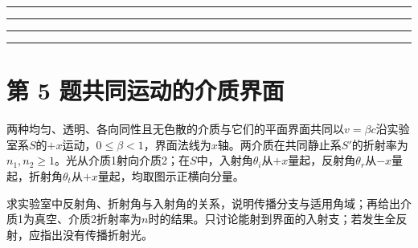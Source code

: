 \documentclass[UTF8,fontset=fandol,a4paper,11pt]{ctexart}
\newcommand{\workarea}{\par\vspace{7mm}\noindent{\small\color{muted}作答区}\par\vspace{4mm}
\noindent\textcolor{rulegray}{\rule{\linewidth}{0.3pt}}\par\vspace{16mm}
\noindent\textcolor{rulegray}{\rule{\linewidth}{0.3pt}}\par\vspace{16mm}
\noindent\textcolor{rulegray}{\rule{\linewidth}{0.3pt}}\par\vspace{16mm}
\noindent\textcolor{rulegray}{\rule{\linewidth}{0.3pt}}}
\begin{document}
\workarea

\clearpage


\section*{第 5 题\quad 共同运动的介质界面}\label{q:5}

两种均匀、透明、各向同性且无色散的介质与它们的平面界面共同以$v=\beta c$沿实验室系$S$的$+x$运动，$0\le\beta<1$，界面法线为$x$轴。两介质在共同静止系$S'$的折射率为$n_1,n_2\ge1$。光从介质1射向介质2；在$S$中，入射角$\theta_i$从$+x$量起，反射角$\theta_r$从$-x$量起，折射角$\theta_t$从$+x$量起，均取图示正横向分量。

求实验室中反射角、折射角与入射角的关系，说明传播分支与适用角域；再给出介质1为真空、介质2折射率为$n$时的结果。只讨论能射到界面的入射支；若发生全反射，应指出没有传播折射光。
\end{document}

